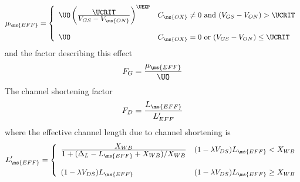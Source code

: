 {\begin{equation}
\mu_{\ms{EFF}} = \left\{ \begin{array}{ll}
               \UO\left( {{\textstyle\UCRIT}\over
                {\textstyle V_{GS}-V_{\ms{ON}}}} \right)^{\UEXP}
               & C_{\ms{OX}} \ne 0\mbox{ and } (V_{GS}-V_{ON}) > \UCRIT\\
                 \\
                 \UO
               & C_{\ms{OX}} = 0\mbox{ or } (V_{GS}-V_{ON}) \le \UCRIT
               \end{array} \right. %
\end{equation}
and the factor describing this effect
\begin{equation}
    F_G = {{\mu_{\ms{EFF}}}\over{\UO}}
\end{equation}
The channel shortening factor
\begin{equation}
    F_D = {{L_{\ms{EFF}}}\over{L'_{EFF}}}
\end{equation}
where the effective channel length due to channel shortening is
\begin{equation}
L'_{\ms{EFF}} = \left\{ \begin{array}{ll}
    {{\textstyle X_{WB}}\over
    {\textstyle 1 +(\Delta_L - L_{\ms{EFF}} + X_{WB})/X_{WB}}}
    & (1-\lambda V_{DS})L_{\ms{EFF}} < X_{WB} \\ \\
    (1-\lambda V_{DS})L_{\ms{EFF}}
    & (1-\lambda V_{DS})L_{\ms{EFF}} \ge X_{WB}
    \end{array} \right. %
\label{m2leff}
\end{equation}

}
